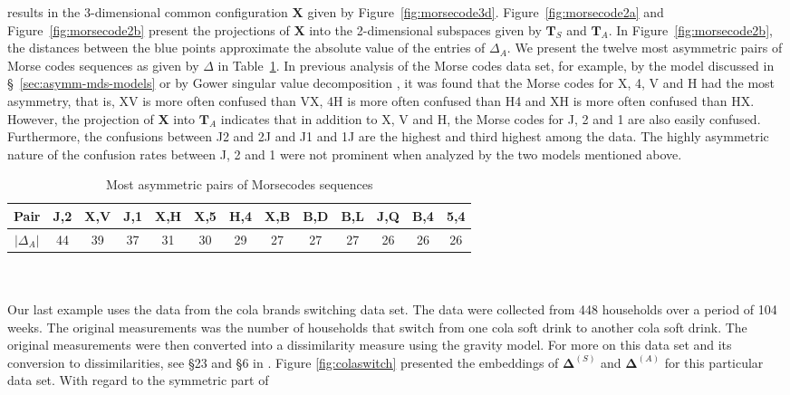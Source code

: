 results in the 3-dimensional common configuration $\mathbf{X}$ given
by Figure~\ref{fig:morsecode3d}. Figure~\ref{fig:morsecode2a} and
Figure~\ref{fig:morsecode2b} present the projections of $\mathbf{X}$
into the 2-dimensional subspaces given by $\mathbf{T}_S$ and
$\mathbf{T}_A$. In Figure~\ref{fig:morsecode2b}, the distances between
the blue points approximate the absolute value of the entries of
$\Delta_A$.
%
%
We present the twelve most asymmetric pairs of Morse codes sequences
as given by $\Delta$ in Table~\ref{tab:morsecode}. In previous
analysis of the Morse codes data set, for example, by the model
discussed in \S~\ref{sec:asymm-mds-models} or by Gower singular value
decomposition \citep{gower77:_recen}, it was found that the Morse
codes for X, 4, V and H had the most asymmetry, that is, XV is more
often confused than VX, 4H is more often confused than H4 and XH is
more often confused than HX. However, the projection of $\mathbf{X}$
into $\mathbf{T}_A$ indicates that in addition to X, V and H, the
Morse codes for J, 2 and 1 are also easily confused. Furthermore, the
confusions between J2 and 2J and J1 and 1J are the highest and third
highest among the data. The highly asymmetric nature of the confusion
rates between J, 2 and 1 were not prominent when analyzed by the two
models mentioned above.
\begin{table}
\begin{tabular}[h]{|c|c|c|c|c|c|c|c|c|c|c|c|c|}
  \hline
  Pair & J,2 & X,V & J,1 & X,H & X,5 & H,4 & X,B & B,D & B,L & J,Q &
  B,4 & 5,4 \\ \hline
  $|\Delta_A|$ & 44 & 39 & 37 & 31 & 30 & 29 & 27 & 27 & 27 &  26
  & 26 & 26 \\ \hline
\end{tabular}
\caption{Most asymmetric pairs of Morsecodes sequences}
\label{tab:morsecode}
\end{table}
\\ \\
\noindent
Our last example uses the data from the cola brands switching data
set. The data were collected from 448 households over a period of 104
weeks. The original measurements was the number of households that
switch from one cola soft drink to another cola soft drink. The
original measurements were then converted into a dissimilarity measure
using the gravity model. For more on this data set and its conversion
to dissimilarities, see \S 23 and \S 6 in
\citet{borg05:_moder}. Figure \ref{fig:colaswitch} presented the
embeddings of $\bm{\Delta}^{(S)}$ and $\bm{\Delta}^{(A)}$ for this
particular data set. With regard to the symmetric part of
